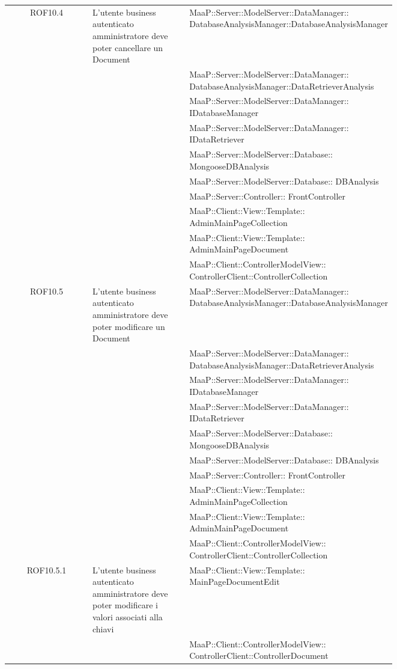 \begin{center}
\begin{longtable}{|c|p{0.25\linewidth}|p{0.5\linewidth}|}
\midrule
ROF10.4
& L'utente business autenticato amministratore deve poter cancellare un Document
& MaaP::Server::ModelServer::DataManager:: DatabaseAnalysisManager::DatabaseAnalysisManager\\
& & MaaP::Server::ModelServer::DataManager:: DatabaseAnalysisManager::DataRetrieverAnalysis\\
& & MaaP::Server::ModelServer::DataManager:: IDatabaseManager\\
& & MaaP::Server::ModelServer::DataManager:: IDataRetriever\\
& & MaaP::Server::ModelServer::Database:: MongooseDBAnalysis\\
& & MaaP::Server::ModelServer::Database:: DBAnalysis\\
& & MaaP::Server::Controller:: FrontController\\
& & MaaP::Client::View::Template:: AdminMainPageCollection\\
& & MaaP::Client::View::Template:: AdminMainPageDocument\\
& & MaaP::Client::ControllerModelView:: ControllerClient::ControllerCollection\\

\midrule
ROF10.5
& L'utente business autenticato amministratore deve poter modificare un Document
& MaaP::Server::ModelServer::DataManager:: DatabaseAnalysisManager::DatabaseAnalysisManager\\
& & MaaP::Server::ModelServer::DataManager:: DatabaseAnalysisManager::DataRetrieverAnalysis\\
& & MaaP::Server::ModelServer::DataManager:: IDatabaseManager\\
& & MaaP::Server::ModelServer::DataManager:: IDataRetriever\\
& & MaaP::Server::ModelServer::Database:: MongooseDBAnalysis\\
& & MaaP::Server::ModelServer::Database:: DBAnalysis\\
& & MaaP::Server::Controller:: FrontController\\
& & MaaP::Client::View::Template:: AdminMainPageCollection\\
& & MaaP::Client::View::Template:: AdminMainPageDocument\\
& & MaaP::Client::ControllerModelView:: ControllerClient::ControllerCollection\\

\midrule
ROF10.5.1
& L'utente business autenticato amministratore deve poter modificare i valori associati alla chiavi
& MaaP::Client::View::Template:: MainPageDocumentEdit\\
& & MaaP::Client::ControllerModelView:: ControllerClient::ControllerDocument\\


\end{longtable}
\end{center}
